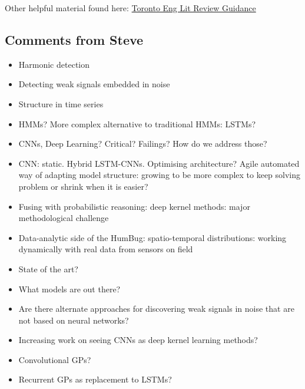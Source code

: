 \documentclass[12pt]{llncs}
\begin{document}
Other helpful material found here: \href{http://ecp.engineering.utoronto.ca/online-handbook/components-of-documents/literature-reviews/}{Toronto Eng Lit Review Guidance}


\subsection{Comments from Steve}
\begin{itemize}
	\item Harmonic detection
	\item Detecting weak signals embedded in noise
	\item Structure in time series
	\item HMMs? More complex alternative to traditional HMMs: LSTMs?
	\item CNNs, Deep Learning? Critical? Failings? How do we address those?
	\item CNN: static. Hybrid LSTM-CNNs. Optimising architecture? Agile automated way of adapting model structure: growing to be more complex to keep solving problem or shrink when it is easier?
	\item Fusing with probabilistic reasoning: deep kernel methods: major methodological challenge


	\item Data-analytic side of the HumBug: spatio-temporal distributions: working dynamically with real data from sensors on field
	\item State of the art?
	\item What models are out there?
	\item Are there alternate approaches for discovering weak signals in noise that are not based on neural networks?
	\item Increasing work on seeing CNNs as deep kernel learning methods?
	\item Convolutional GPs?
	\item Recurrent GPs as replacement to LSTMs?
\end{itemize}
\end{document}
